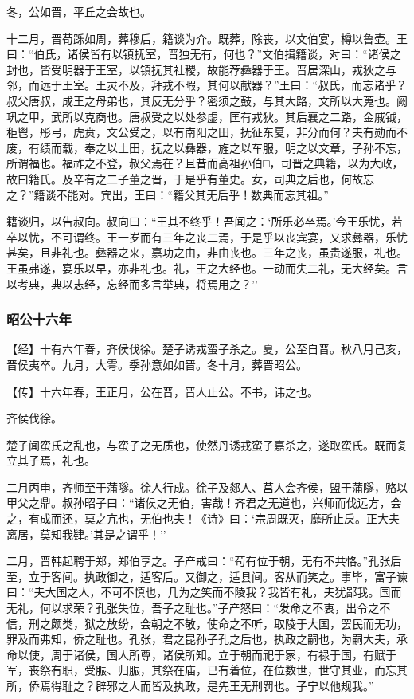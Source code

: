 \documentclass[]{article}
\begin{document}
冬，公如晋，平丘之会故也。

十二月，晋荀跞如周，葬穆后，籍谈为介。既葬，除丧，以文伯宴，樽以鲁壶。王曰：``伯氏，诸侯皆有以镇抚室，晋独无有，何也？''文伯揖籍谈，对曰：``诸侯之封也，皆受明器于王室，以镇抚其社稷，故能荐彝器于王。晋居深山，戎狄之与邻，而远于王室。王灵不及，拜戎不暇，其何以献器？''王曰：``叔氏，而忘诸乎？叔父唐叔，成王之母弟也，其反无分乎？密须之鼓，与其大路，文所以大蒐也。阙巩之甲，武所以克商也。唐叔受之以处参虚，匡有戎狄。其后襄之二路，金戚钺，秬鬯，彤弓，虎贲，文公受之，以有南阳之田，抚征东夏，非分而何？夫有勋而不废，有绩而载，奉之以土田，抚之以彝器，旌之以车服，明之以文章，子孙不忘，所谓福也。福祚之不登，叔父焉在？且昔而高祖孙伯□，司晋之典籍，以为大政，故曰籍氏。及辛有之二子董之晋，于是乎有董史。女，司典之后也，何故忘之？''籍谈不能对。宾出，王曰：``籍父其无后乎！数典而忘其祖。''

籍谈归，以告叔向。叔向曰：``王其不终乎！吾闻之：`所乐必卒焉。'今王乐忧，若卒以忧，不可谓终。王一岁而有三年之丧二焉，于是乎以丧宾宴，又求彝器，乐忧甚矣，且非礼也。彝器之来，嘉功之由，非由丧也。三年之丧，虽贵遂服，礼也。王虽弗遂，宴乐以早，亦非礼也。礼，王之大经也。一动而失二礼，无大经矣。言以考典，典以志经，忘经而多言举典，将焉用之？''

\hypertarget{header-n2632}{%
\subsubsection{昭公十六年}\label{header-n2632}}

【经】十有六年春，齐侯伐徐。楚子诱戎蛮子杀之。夏，公至自晋。秋八月己亥，晋侯夷卒。九月，大雩。季孙意如如晋。冬十月，葬晋昭公。

【传】十六年春，王正月，公在晋，晋人止公。不书，讳之也。

齐侯伐徐。

楚子闻蛮氏之乱也，与蛮子之无质也，使然丹诱戎蛮子嘉杀之，遂取蛮氏。既而复立其子焉，礼也。

二月丙申，齐师至于蒲隧。徐人行成。徐子及郯人、莒人会齐侯，盟于蒲隧，赂以甲父之鼎。叔孙昭子曰：``诸侯之无伯，害哉！齐君之无道也，兴师而伐远方，会之，有成而还，莫之亢也，无伯也夫！《诗》曰：`宗周既灭，靡所止戾。正大夫离居，莫知我肄。'其是之谓乎！''

二月，晋韩起聘于郑，郑伯享之。子产戒曰：``苟有位于朝，无有不共恪。''孔张后至，立于客间。执政御之，适客后。又御之，适县间。客从而笑之。事毕，富子谏曰：``夫大国之人，不可不慎也，几为之笑而不陵我？我皆有礼，夫犹鄙我。国而无礼，何以求荣？孔张失位，吾子之耻也。''子产怒曰：``发命之不衷，出令之不信，刑之颇类，狱之放纷，会朝之不敬，使命之不听，取陵于大国，罢民而无功，罪及而弗知，侨之耻也。孔张，君之昆孙子孔之后也，执政之嗣也，为嗣大夫，承命以使，周于诸侯，国人所尊，诸侯所知。立于朝而祀于家，有禄于国，有赋于军，丧祭有职，受脤、归脤，其祭在庙，已有着位，在位数世，世守其业，而忘其所，侨焉得耻之？辟邪之人而皆及执政，是先王无刑罚也。子宁以他规我。''
\end{document}
